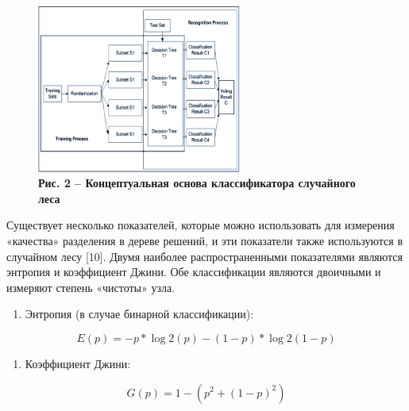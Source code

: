 \begin{figure}[H]
	\centering
	\includegraphics[height=0.35\textwidth, width=0.6\textwidth]{assets/111}
	\caption*{\bfseries Рис. 2 -- Концептуальная основа классификатора случайного леса}
\end{figure}

\begin{multicols}{2}


Существует несколько показателей, которые можно использовать для
измерения «качества» разделения в дереве решений, и эти показатели также
используются в случайном лесу {[}10{]}. Двумя наиболее распространенными
показателями являются энтропия и коэффициент Джини. Обе классификации
являются двоичными и измеряют степень «чистоты» узла.
\end{multicols}

\begin{enumerate}
\def\labelenumi{\arabic{enumi}.}
\item
  Энтропия (в случае бинарной классификации):
\end{enumerate}
\begin{equation}
	E(p)= - p*\log2(p)-(1-p)*\log2(1-p)
\end{equation}

\begin{enumerate}
\def\labelenumi{\arabic{enumi}.}
\setcounter{enumi}{1}
\item
  Коэффициент Джини:
\end{enumerate}

\begin{equation}
	G(p)= 1 - (p^2 + (1 - p)^2)
\end{equation}

